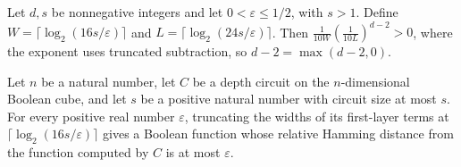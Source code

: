 \begin{theorem}
\label{FABL.lmnRestrictionRate_pos}
\leanok
{}
Let $d,s$ be nonnegative integers and let $0<\varepsilon\le 1/2$, with $s>1$. Define
$W=\lceil\log_2(16s/\varepsilon)\rceil$ and $L=\lceil\log_2(24s/\varepsilon)\rceil$.
Then $\frac{1}{10W}\left(\frac{1}{10L}\right)^{d-2}>0$, where the exponent uses
truncated subtraction, so $d-2=\max(d-2,0)$.
\end{theorem}

\begin{theorem}
\label{FABL.DepthCircuit.relativeHammingDist_truncateWidth_lmnWidthCutoff_le}
\leanok
{}
Let $n$ be a natural number, let $C$ be a depth circuit on the $n$-dimensional Boolean
cube, and let $s$ be a positive natural number with circuit size at most $s$. For every positive real number $\varepsilon$, truncating the widths of its first-layer terms at
$\lceil\log_2(16s/\varepsilon)\rceil$ gives a Boolean function whose relative Hamming
distance from the function computed by $C$ is at most $\varepsilon$.
\end{theorem}

